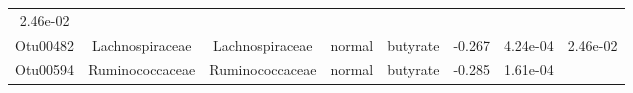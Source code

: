 \documentclass[11pt,]{article}
\begin{document}
\begin{longtable}[]{@{}cccccccc@{}}
\begin{minipage}[t]{0.08\columnwidth}
2.46e-02\strut
\end{minipage}\tabularnewline
\begin{minipage}[t]{0.08\columnwidth}\centering\strut
Otu00482\strut
\end{minipage} & \begin{minipage}[t]{0.15\columnwidth}\centering\strut
Lachnospiraceae\strut
\end{minipage} & \begin{minipage}[t]{0.15\columnwidth}\centering\strut
Lachnospiraceae\strut
\end{minipage} & \begin{minipage}[t]{0.08\columnwidth}\centering\strut
normal\strut
\end{minipage} & \begin{minipage}[t]{0.09\columnwidth}\centering\strut
butyrate\strut
\end{minipage} & \begin{minipage}[t]{0.07\columnwidth}\centering\strut
-0.267\strut
\end{minipage} & \begin{minipage}[t]{0.08\columnwidth}\centering\strut
4.24e-04\strut
\end{minipage} & \begin{minipage}[t]{0.08\columnwidth}\centering\strut
2.46e-02\strut
\end{minipage}\tabularnewline
\begin{minipage}[t]{0.08\columnwidth}\centering\strut
Otu00594\strut
\end{minipage} & \begin{minipage}[t]{0.15\columnwidth}\centering\strut
Ruminococcaceae\strut
\end{minipage} & \begin{minipage}[t]{0.15\columnwidth}\centering\strut
Ruminococcaceae\strut
\end{minipage} & \begin{minipage}[t]{0.08\columnwidth}\centering\strut
normal\strut
\end{minipage} & \begin{minipage}[t]{0.09\columnwidth}\centering\strut
butyrate\strut
\end{minipage} & \begin{minipage}[t]{0.07\columnwidth}\centering\strut
-0.285\strut
\end{minipage} & \begin{minipage}[t]{0.08\columnwidth}\centering\strut
1.61e-04\strut
\end{minipage} & \begin{minipage}[t]{0.08\columnwidth}\centering\strut

\end{minipage}
\end{longtable}
\end{document}

